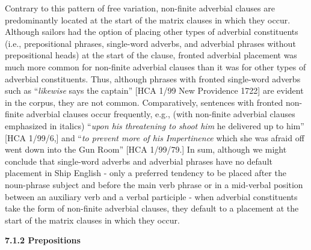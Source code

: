 \begin{styleStandard}
Contrary to this pattern of free variation, non-finite adverbial clauses are predominantly located at the start of the matrix clauses in which they occur. Although sailors had the option of placing other types of adverbial constituents (i.e., prepositional phrases, single-word adverbs, and adverbial phrases without prepositional heads) at the start of the clause, fronted adverbial placement was much more common for non-finite adverbial clauses than it was for other types of adverbial constituents. Thus, although phrases with fronted single-word adverbs such as “\textit{likewise }says the captain” [HCA 1/99 New Providence 1722] are evident in the corpus, they are not common. Comparatively, sentences with fronted non-finite adverbial clauses occur frequently, e.g., (with non-finite adverbial clauses emphasized in italics) “\textit{upon his threatening to shoot him} he delivered up to him” [HCA 1/99/6,] and “\textit{to prevent more of his Impertinence} which she was afraid off went down into the Gun Room” [HCA 1/99/79.] In sum, although we might conclude that single-word adverbs and adverbial phrases have no default placement in Ship English - only a preferred tendency to be placed after the noun-phrase subject and before the main verb phrase or in a mid-verbal position between an auxiliary verb and a verbal participle - when adverbial constituents take the form of non-finite adverbial clauses, they default to a placement at the start of the matrix clauses in which they occur. 
\end{styleStandard}


\begin{styleStandard}
\textbf{7.1.2 Prepositions }
\end{styleStandard}


